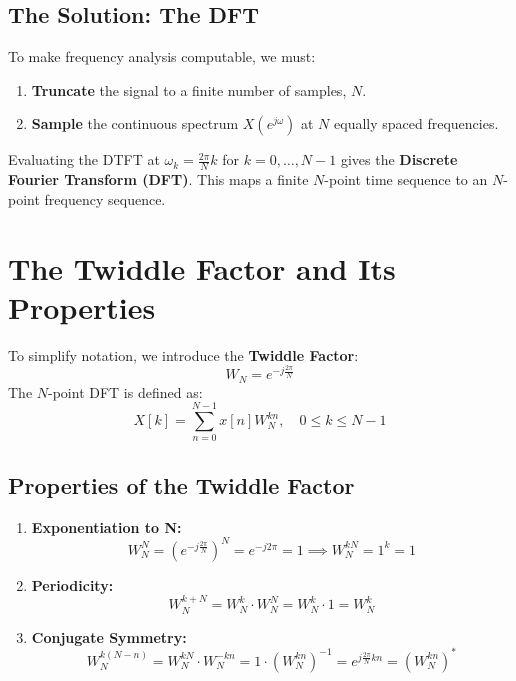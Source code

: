 \documentclass[11pt,a4paper]{article}
\begin{document}
\subsection{The Solution: The DFT}
To make frequency analysis computable, we must:
\begin{enumerate}
    \item \textbf{Truncate} the signal to a finite number of samples, $N$.
    \item \textbf{Sample} the continuous spectrum $X(e^{j\omega})$ at $N$ equally spaced frequencies.
\end{enumerate}
Evaluating the DTFT at $\omega_k = \frac{2\pi}{N}k$ for $k = 0, \dots, N-1$ gives the \textbf{Discrete Fourier Transform (DFT)}. This maps a finite $N$-point time sequence to an $N$-point frequency sequence.

\section{The Twiddle Factor and Its Properties}
To simplify notation, we introduce the \textbf{Twiddle Factor}:
\begin{equation}
W_N = e^{-j\frac{2\pi}{N}}
\end{equation}
The $N$-point DFT is defined as:
\begin{equation}
X[k] = \sum_{n=0}^{N-1} x[n] W_N^{kn}, \quad 0 \le k \le N-1
\end{equation}

\subsection{Properties of the Twiddle Factor}
\begin{enumerate}
    \item \textbf{Exponentiation to N:}
    \begin{equation*}
    W_N^N = \left(e^{-j\frac{2\pi}{N}}\right)^N = e^{-j2\pi} = 1 \implies W_N^{kN} = 1^k = 1
    \end{equation*}
    \item \textbf{Periodicity:}
    \begin{equation*}
    W_N^{k+N} = W_N^k \cdot W_N^N = W_N^k \cdot 1 = W_N^k
    \end{equation*}
    \item \textbf{Conjugate Symmetry:}
    \begin{equation*}
    W_N^{k(N-n)} = W_N^{kN} \cdot W_N^{-kn} = 1 \cdot (W_N^{kn})^{-1} = e^{j\frac{2\pi}{N}kn} = (W_N^{kn})^*
    \end{equation*}
\end{enumerate}
\end{document}
